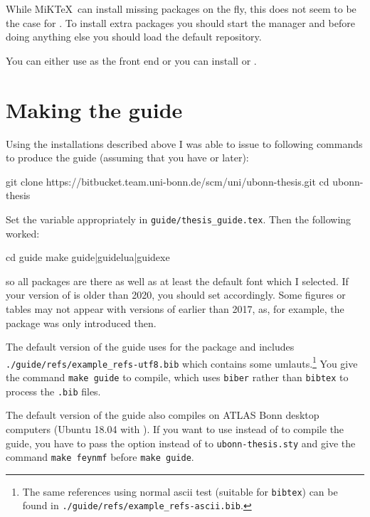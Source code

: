 While MiK\TeX\ can install missing packages on the fly, this does not
seem to be the case for \TeXLive. To install extra packages you should
start the \TeXLive manager and before doing anything else you should
load the default repository.

You can either use \TeXworks as the front end or you can install
\TeXstudio or \TeXmaker.


\section{Making the guide}%
\label{sec:app:guide}

Using the installations described above I was able to issue to following commands to
produce the guide (assuming that you have  or later):
\begin{bashlisting}
git clone https://bitbucket.team.uni-bonn.de/scm/uni/ubonn-thesis.git
cd ubonn-thesis
\end{bashlisting}
\noindent Set the  variable appropriately in \texttt{guide/thesis\_guide.tex}.
\noindent Then the following worked:
\begin{bashlisting}
cd guide
make guide|guidelua|guidexe
\end{bashlisting}
\noindent so all packages are there as well as at least the default font which I selected.
If your version of \TeXLive is older than 2020, you should set  accordingly.
Some figures or tables may not appear with versions of \TeXLive earlier than 2017,
as, for example, the  package was only introduced then.

The default version of the guide uses  for the
 package and includes\\
\texttt{./guide/refs/example\_refs-utf8.bib} which contains some umlauts.\footnote{%
The same references using normal ascii test (suitable for \texttt{bibtex}) can be found in
\texttt{./guide/refs/example\_refs-ascii.bib}.}
You give the command \texttt{make guide} to compile, which uses \texttt{biber} rather than
\texttt{bibtex} to process the \texttt{.bib} files.

The default version of the guide also compiles on ATLAS Bonn desktop
computers (Ubuntu 18.04 with ). %
If you want to use
 instead of  to compile the guide, you
have to pass the option  instead of  to \texttt{ubonn-thesis.sty} 
and give the command \texttt{make feynmf} before \texttt{make guide}.

